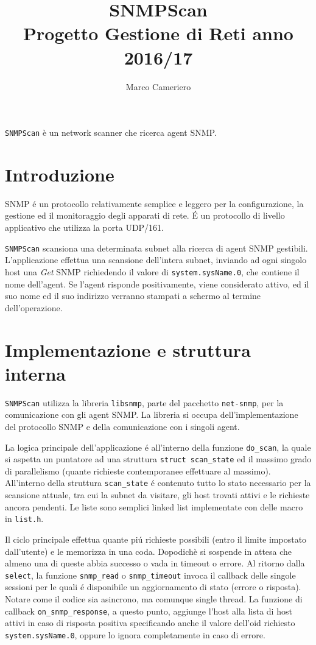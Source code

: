 \documentclass{article}
\title{
    SNMPScan\\
    \large{Progetto Gestione di Reti anno 2016/17}
}
\author{Marco Cameriero}
\date{}
\providecommand{\inlinecode}[1]{\texttt{#1}}
\begin{document}
\maketitle



\inlinecode{SNMPScan} \`{e} un network scanner che ricerca agent SNMP.



\section{Introduzione}

SNMP \'{e} un protocollo relativamente semplice e leggero per la configurazione,
la gestione ed il monitoraggio degli apparati di rete. \'{E} un protocollo di livello
applicativo che utilizza la porta UDP/161.

\inlinecode{SNMPScan} scansiona una determinata subnet alla ricerca di agent SNMP gestibili.
L'applicazione effettua una scansione dell'intera subnet, inviando ad ogni singolo host una
\textit{Get} SNMP richiedendo il valore di \inlinecode{system.sysName.0}, che contiene il nome
dell'agent. Se l'agent risponde positivamente, viene considerato attivo, ed il suo nome
ed il suo indirizzo verranno stampati a schermo al termine dell'operazione.



\section{Implementazione e struttura interna}

\inlinecode{SNMPScan} utilizza la libreria \inlinecode{libsnmp}, parte del pacchetto
\inlinecode{net-snmp}, per la comunicazione con gli agent SNMP. La libreria si occupa
dell'implementazione del protocollo SNMP e della comunicazione con i singoli agent.

La logica principale dell'applicazione \'{e} all'interno della funzione \inlinecode{do\_scan},
la quale si aspetta un puntatore ad una struttura \inlinecode{struct scan\_state} ed il massimo
grado di parallelismo (quante richieste contemporanee effettuare al massimo). All'interno della
struttura \inlinecode{scan\_state} \'{e} contenuto tutto lo stato necessario per la scansione attuale,
tra cui la subnet da visitare, gli host trovati attivi e le richieste ancora pendenti. Le liste
sono semplici linked list implementate con delle macro in \inlinecode{list.h}.

Il ciclo principale effettua quante pi\'{u} richieste possibili (entro il limite impostato
dall'utente) e le memorizza in una coda. Dopodich\`{e} si sospende in attesa che almeno una di queste
abbia successo o vada in timeout o errore. Al ritorno dalla \inlinecode{select}, la funzione
\inlinecode{snmp\_read} o \inlinecode{snmp\_timeout} invoca il callback delle singole sessioni
per le quali \'{e} disponibile un aggiornamento di stato (errore o risposta). Notare come il codice
sia asincrono, ma comunque single thread. La funzione di callback \inlinecode{on\_snmp\_response},
a questo punto, aggiunge l'host alla lista di host attivi in caso di risposta positiva specificando
anche il valore dell'oid richiesto \inlinecode{system.sysName.0}, oppure lo ignora completamente
in caso di errore.
\end{document}
